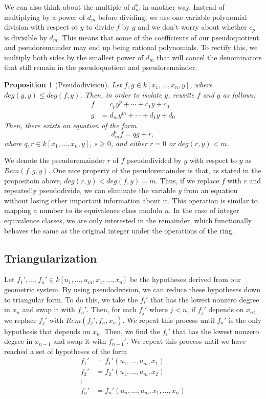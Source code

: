 \documentclass{article}
\theoremstyle{plain}
\newtheorem{Proposition}[Theorem]{Proposition}
\theoremstyle{definition}
\theoremstyle{remark}
\begin{document}
We can also think about the multiple of $d_m^s$ in another way. 
Instead of multiplying by a power of $d_m$ before dividing, we use one variable polynomial division with respect ot $y$ to divide $f$ by $g$ and we don't worry about whether $c_p$ is divisible by $d_m$. 
This means that some of the coefficients of our pseudoquotient and pseudoremainder may end up being rational polynomials. 
To rectify this, we multiply both sides by the smallest power of $d_m$ that will cancel the denominators that still remain in the pseudoquotient and pseudoremainder.
\begin{Proposition}[Pseudodivision]
Let $f, g \in k[x_1,\dots,x_n,y]$, where $deg(g,y) \leq deg(f,y)$. Then, in order to isolate $y$, rewrite $f$ and $g$ as follows:
\begin {align*}
    f & = c_py^p + \cdots + c_1y + c_0\\
    g & = d_my^m + \cdots + d_1y + d_0
\end{align*}
Then, there exists an equation of the form $$d_m^s f = qg + r,$$ where $q,r \in k[x_1,\dots,x_n,y]$, $s \geq 0$, and either $r = 0$ or $deg(r,y) < m$.
\end{Proposition}

We denote the pseudoremainder $r$ of $f$ pseudodivided by $g$ with respect to $y$ as $Rem(f,g,y)$.
One nice property of the pseudoremainder is that, as stated in the propositoin above, $deg(r,y) < deg(f,y) = m$. 
Thus, if we replace $f$ with $r$ and repeatedly pseudodivide, we can eliminate the variable $y$ from an equation without losing other important information about it. 
This operation is similar to mapping a number to its equivalence class modulo $n$. 
In the case of integer equivalence classes, we are only interested in the remainder, which functionally behaves the same as the original integer under the operations of the ring.

\subsection{Triangularization}
Let $f_1',\dots,f_n' \in k[u_1,\dots,u_m,x_1,\dots,x_n]$ be the hypotheses derived from our geometric system.
By using pseudodivision, we can reduce these hypotheses down to triangular form. To do this, we take the $f_i'$ that has the lowest nonzero degree in $x_n$ and swap it with $f_n'$.
Then, for each $f_j'$ where $j < n$, if $f_j'$ depends on $x_n$, we replace $f_j'$ with $Rem(f_j', f_n, x_n)$. We repeat this process until $f_n'$ is the only hypothesis that depends on $x_n$. 
Then, we find the $f_i'$ that has the lowest nonzero degree in $x_{n-1}$ and swap it with $f_{n-1}'$.
We repeat this process until we have reached a set of hypotheses of the form
\begin{align*}
    f_1' & = f_1'(u_1,\dots,u_m,x_1)\\
    f_2' & = f_2'(u_1,\dots,u_m,x_2)\\
    \vdots & \\
    f_n' & = f_n'(u_n,\dots,u_m,x_1,\dots,x_n)
\end{align*}
\end{document}
